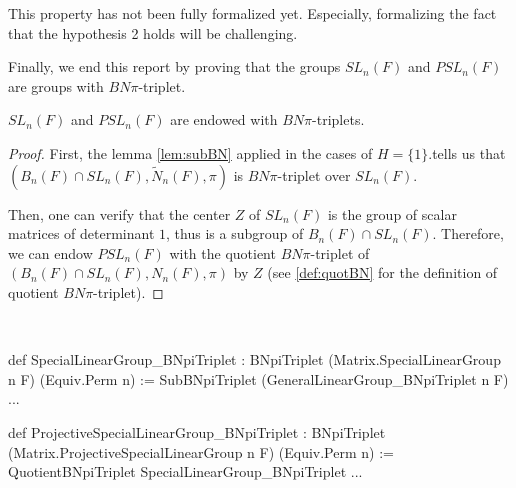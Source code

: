 \begin{remark}
    This property has not been fully formalized yet. Especially, formalizing the fact that the hypothesis 2 holds will be challenging.
\end{remark}



Finally, we end this report by proving that the groups $SL_n(F)$ and $PSL_n(F)$ are groups with $BN\pi$-triplet.

\begin{proposition}
    $SL_n\left( F \right)$ and $PSL_n\left( F \right)$ are endowed with $BN\pi$-triplets. 
\end{proposition}
\begin{proof}
    First, the lemma \ref{lem:subBN} applied in the cases of $H = \{1\}$.tells us that $\left( B_n\left( F \right) \cap SL_n(F), \tilde{N}_n(F), \pi \right)$ is $BN\pi$-triplet over $SL_n(F)$.

    Then, one can verify that the center $Z$ of $SL_n\left( F \right)$ is the group of scalar matrices of determinant $1$, thus is a subgroup of $B_n(F) \cap SL_n\left( F \right)$. Therefore, we can endow $PSL_n(F)$ with the quotient $BN\pi$-triplet of $\left( B_n(F) \cap SL_n(F), N_n(F), \pi \right)$ by $Z$ (see \ref{def:quotBN} for the definition of quotient $BN\pi$-triplet).
\end{proof}

\begin{implementation} \
\begin{leancode}
def SpecialLinearGroup_BNpiTriplet : BNpiTriplet (Matrix.SpecialLinearGroup n F) (Equiv.Perm n) :=
  SubBNpiTriplet (GeneralLinearGroup_BNpiTriplet n F) ...

def ProjectiveSpecialLinearGroup_BNpiTriplet :
  BNpiTriplet (Matrix.ProjectiveSpecialLinearGroup n F) (Equiv.Perm n) :=
    QuotientBNpiTriplet SpecialLinearGroup_BNpiTriplet ...
\end{leancode}
\end{implementation}

